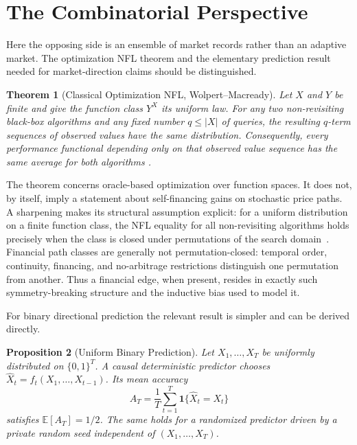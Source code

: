 \documentclass[aps,pra,reprint,superscriptaddress,amsmath,amssymb,floatfix]{revtex4-2}
\theoremstyle{plain}
\newtheorem{theorem}{Theorem}
\newtheorem{proposition}[theorem]{Proposition}
\theoremstyle{definition}
\theoremstyle{remark}
\begin{document}
\section{The Combinatorial Perspective}
\label{sec:nfl}

Here the opposing side is an ensemble of market records rather than an
adaptive market. The optimization NFL theorem and the elementary prediction
result needed for market-direction claims should be distinguished.

\begin{theorem}[Classical Optimization NFL, Wolpert--Macready]
  \label{thm:nfl}
  Let \(X\) and \(Y\) be finite and give the function class \(Y^X\) its uniform
  law. For any two non-revisiting black-box algorithms and any fixed number
  \(q\leq |X|\) of queries, the resulting \(q\)-term sequences of observed
  values have the same distribution. Consequently, every performance
  functional depending only on that observed value sequence has the same
  average for both algorithms
  \cite{Wolpert:1997:NFL:2221336.2221408}.
\end{theorem}

The theorem concerns oracle-based optimization over function spaces. It does
not, by itself, imply a statement about self-financing gains on stochastic
price paths. A sharpening makes its structural assumption explicit: for a
uniform distribution on a finite function class, the NFL equality for all
non-revisiting algorithms holds precisely when the class is closed under
permutations of the search domain~\cite{SchumacherVoseWhitley2001}. Financial
path classes are generally not permutation-closed: temporal order, continuity,
financing, and no-arbitrage restrictions distinguish one permutation from
another. Thus a financial edge, when present, resides in exactly such
symmetry-breaking structure and the inductive bias used to model it.

For binary directional prediction the relevant result is simpler and can be
derived directly.

\begin{proposition}[Uniform Binary Prediction]
  \label{prop:binary}
  Let \(X_1,\ldots,X_T\) be uniformly distributed on \(\{0,1\}^T\). A causal
  deterministic predictor chooses
  \(\widehat X_t=f_t(X_1,\ldots,X_{t-1})\). Its mean accuracy
  \[
    A_T=\frac1T\sum_{t=1}^T
      \mathbf{1}\{\widehat X_t=X_t\}
  \]
  satisfies \(\mathbb{E}[A_T]=1/2\). The same holds for a randomized predictor
  driven by a private random seed independent of
  \((X_1,\ldots,X_T)\).
\end{proposition}
\end{document}
